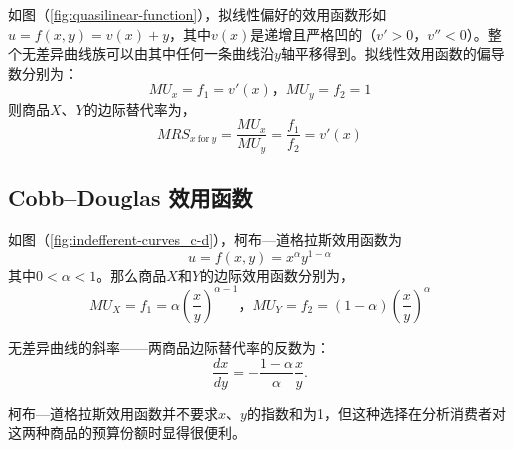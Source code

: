 如图（\ref{fig:quasilinear-function}），拟线性偏好的效用函数形如$u=f(x,y)=v(x) + y$，其中$v(x)$是递增且严格凹的（$v'>0$，$v''<0$）。整个无差异曲线族可以由其中任何一条曲线沿$y$轴平移得到。拟线性效用函数的偏导数分别为：
\[
MU_x = f_1 =v'(x) \text{，} MU_y = f_2 =1
\]
则商品$X$、$Y$的边际替代率为，
\begin{equation}
MRS_{x~\text{for}~y} =\frac{MU_x}{MU_y} = \frac{f_1}{f_2} = v'(x)
\end{equation}

\subsection[Cobb--Douglas]{Cobb--Douglas 效用函数}

如图（\ref{fig:indefferent-curves_c-d}），柯布—道格拉斯效用函数为
\begin{equation}
u=f(x,y) = x^{\alpha}y^{1-\alpha}
\label{eq:}
\end{equation}
其中$0 < \alpha < 1$。那么商品$X$和$Y$的边际效用函数分别为，
\[
MU_X=f_1=\alpha (\frac{x}{y})^{\alpha - 1} \text{，} MU_Y=f_2=(1-\alpha) (\frac{x}{y})^{\alpha}
\]

无差异曲线的斜率——两商品边际替代率的反数为：
\[\frac{dx}{dy} = - \frac{1 - \alpha}{\alpha} \frac{x}{y}.\]

柯布—道格拉斯效用函数并不要求$x$、$y$的指数和为1，但这种选择在分析消费者对这两种商品的预算份额时显得很便利。

